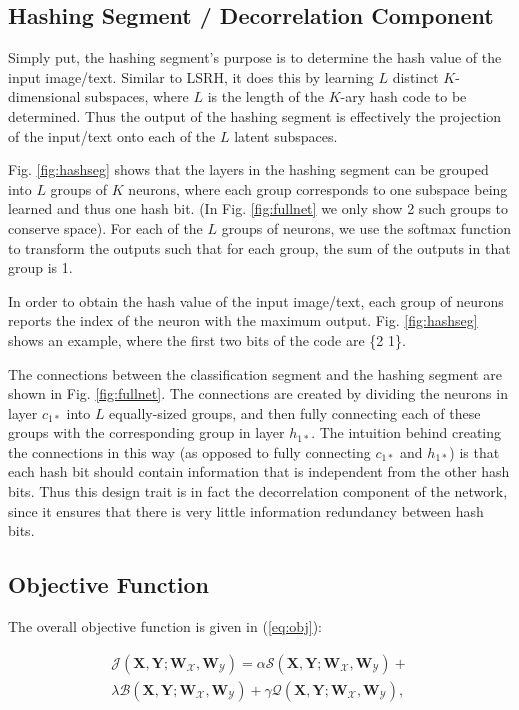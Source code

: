 \documentclass[letterpaper]{article}
\newcommand{\WX}{\mathbf{W}_\mathcal{X}}
\newcommand{\WY}{\mathbf{W}_\mathcal{Y}}
\newcommand{\X}{\mathbf{X}}
\newcommand{\Y}{\mathbf{Y}}
\begin{document}
\subsection{Hashing Segment / Decorrelation Component}

Simply put, the hashing segment's purpose is to determine the hash value of the input image/text. Similar to LSRH, it does this by learning $ L $ distinct $ K $-dimensional subspaces, where $ L $ is the length of the $ K $-ary hash code to be determined. Thus the output of the hashing segment is effectively the projection of the input/text onto each of the $ L $ latent subspaces.

Fig. \ref{fig:hashseg} shows that the layers in the hashing segment can be grouped into $ L $ groups of $ K $ neurons, where each group corresponds to one subspace being learned and thus one hash bit. (In Fig. \ref{fig:fullnet} we only show 2 such groups to conserve space). For each of the $ L $ groups of neurons, we use the softmax function to transform the outputs such that for each group, the sum of the outputs in that group is 1.

In order to obtain the hash value of the input image/text, each group of neurons reports the index of the neuron with the maximum output. Fig. \ref{fig:hashseg} shows an example, where the first two bits of the code are \{2 1\}.

The connections between the classification segment and the hashing segment are shown in Fig. \ref{fig:fullnet}. The connections are created by dividing the neurons in layer $ c_{1*} $ into $ L $ equally-sized groups, and then fully connecting each of these groups with the corresponding group in layer $ h_{1*} $. The intuition behind creating the connections in this way (as opposed to fully connecting $ c_{1*} $ and $ h_{1*} $) is that each hash bit should contain information that is independent from the other hash bits. Thus this design trait is in fact the decorrelation component of the network, since it ensures that there is very little information redundancy between hash bits.

\subsection{Objective Function}

The overall objective function is given in (\ref{eq:obj}):

\begin{equation}
\label{eq:obj}
\begin{gathered}
\mathcal{J}(\X,\Y; \WX, \WY) = \alpha\mathcal{S}(\X,\Y; \WX, \WY) + \\
\lambda\mathcal{B}(\X,\Y; \WX, \WY) + 
\gamma\mathcal{Q}(\X,\Y; \WX, \WY),
\end{gathered}
\end{equation}
\end{document}
